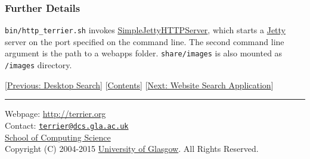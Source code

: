 \subsubsection{Further Details}\label{further-details}

\texttt{bin/http\_terrier.sh} invokes
\href{javadoc/org/terrier/utility/SimpleJettyHTTPServer.html}{SimpleJettyHTTPServer},
which starts a \href{http://www.eclipse.org/jetty/}{Jetty} server on the
port specified on the command line. The second command line argument is
the path to a webapps folder. \texttt{share/images} is also mounted as
\texttt{/images} directory.

{[}\href{terrier_desktop.html}{Previous: Desktop Search}{]}
{[}\href{index.html}{Contents}{]} {[}\href{website_search.html}{Next:
Website Search Application}{]}

\begin{center}\rule{0.5\linewidth}{\linethickness}\end{center}

Webpage: \url{http://terrier.org}\\
Contact:
\href{mailto:terrier@dcs.gla.ac.uk}{\nolinkurl{terrier@dcs.gla.ac.uk}}\\
\href{http://www.dcs.gla.ac.uk/}{School of Computing Science}\\
Copyright (C) 2004-2015 \href{http://www.gla.ac.uk/}{University of
Glasgow}. All Rights Reserved.

~
